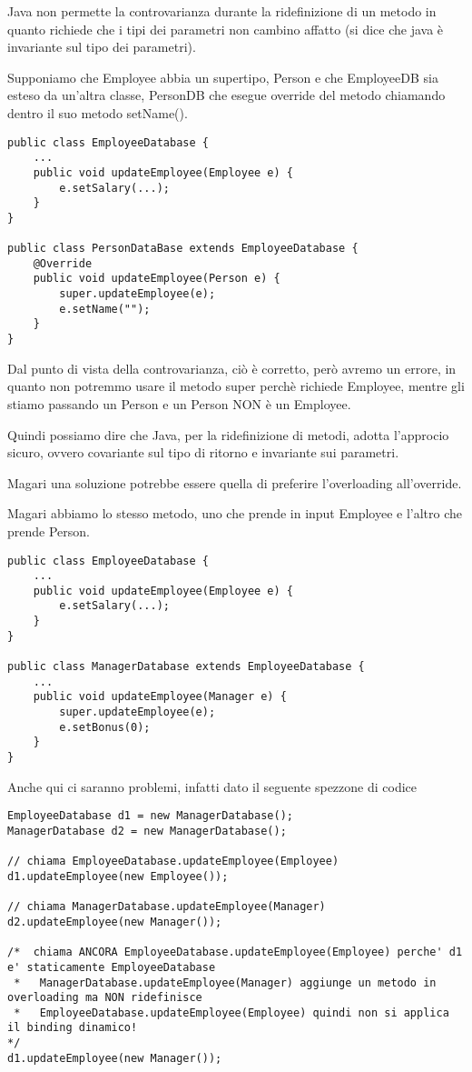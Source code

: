 Java non permette la controvarianza durante la ridefinizione di un metodo in quanto richiede che i tipi dei parametri non cambino affatto 
(si dice che java è invariante sul tipo dei parametri).

Supponiamo che Employee abbia un supertipo, Person e che EmployeeDB sia esteso da un'altra classe, PersonDB che esegue override del metodo chiamando dentro il suo 
metodo setName().

\begin{lstlisting}
public class EmployeeDatabase {
    ...
    public void updateEmployee(Employee e) {
        e.setSalary(...);
    }
}

public class PersonDataBase extends EmployeeDatabase {
    @Override
    public void updateEmployee(Person e) {
        super.updateEmployee(e);
        e.setName("");
    }
}
\end{lstlisting}

Dal punto di vista della controvarianza, ciò è corretto, però avremo un errore, in quanto non potremmo usare il metodo super perchè richiede Employee, mentre gli stiamo 
passando un Person e un Person NON è un Employee.

Quindi possiamo dire che Java, per la ridefinizione di metodi, adotta l'approcio sicuro, ovvero covariante sul tipo di ritorno e invariante sui parametri.

Magari una soluzione potrebbe essere quella di preferire l'overloading all'override. 

Magari abbiamo lo stesso metodo, uno che prende in input Employee e l'altro che prende
Person.

\begin{lstlisting}
public class EmployeeDatabase {
    ...
    public void updateEmployee(Employee e) {
        e.setSalary(...);
    }
}

public class ManagerDatabase extends EmployeeDatabase {
    ...
    public void updateEmployee(Manager e) {
        super.updateEmployee(e);
        e.setBonus(0);
    }
}
\end{lstlisting}

Anche qui ci saranno problemi, infatti dato il seguente spezzone di codice

\begin{lstlisting}
EmployeeDatabase d1 = new ManagerDatabase();
ManagerDatabase d2 = new ManagerDatabase();

// chiama EmployeeDatabase.updateEmployee(Employee)
d1.updateEmployee(new Employee());

// chiama ManagerDatabase.updateEmployee(Manager)
d2.updateEmployee(new Manager());

/*  chiama ANCORA EmployeeDatabase.updateEmployee(Employee) perche' d1 e' staticamente EmployeeDatabase
 *   ManagerDatabase.updateEmployee(Manager) aggiunge un metodo in overloading ma NON ridefinisce 
 *   EmployeeDatabase.updateEmployee(Employee) quindi non si applica il binding dinamico!
*/
d1.updateEmployee(new Manager());
\end{lstlisting}

